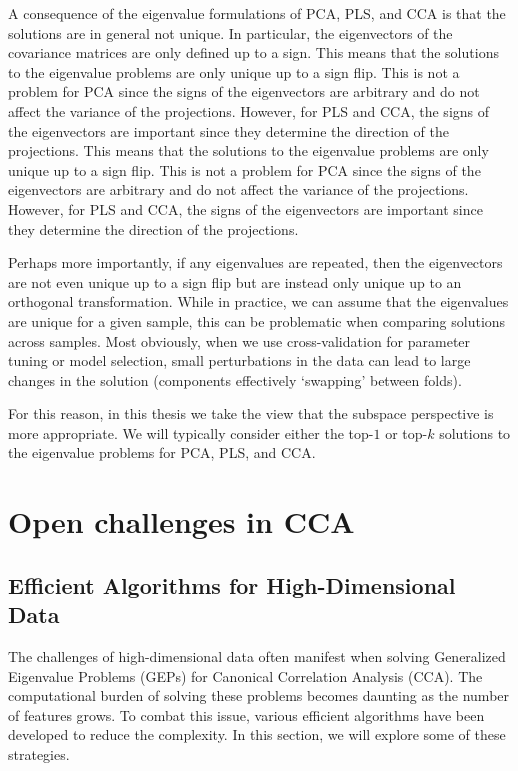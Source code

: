 A consequence of the eigenvalue formulations of PCA, PLS, and CCA is that the solutions are in general not unique.
In particular, the eigenvectors of the covariance matrices are only defined up to a sign.
This means that the solutions to the eigenvalue problems are only unique up to a sign flip.
This is not a problem for PCA since the signs of the eigenvectors are arbitrary and do not affect the variance of the projections.
However, for PLS and CCA, the signs of the eigenvectors are important since they determine the direction of the projections.
This means that the solutions to the eigenvalue problems are only unique up to a sign flip.
This is not a problem for PCA since the signs of the eigenvectors are arbitrary and do not affect the variance of the projections.
However, for PLS and CCA, the signs of the eigenvectors are important since they determine the direction of the projections.

Perhaps more importantly, if any eigenvalues are repeated, then the eigenvectors are not even unique up to a sign flip
but are instead only unique up to an orthogonal transformation.
While in practice, we can assume that the eigenvalues are unique for a given sample, this can be problematic when comparing solutions across samples.
Most obviously, when we use cross-validation for parameter tuning or model selection, small perturbations in the data
can lead to large changes in the solution (components effectively `swapping' between folds).

For this reason, in this thesis we take the view that the subspace perspective is more appropriate. We will typically
consider either the top-$1$ or top-$k$ solutions to the eigenvalue problems for PCA, PLS, and CCA.

\section{Open challenges in CCA}

\subsection{Efficient Algorithms for High-Dimensional Data}

The challenges of high-dimensional data often manifest when solving Generalized Eigenvalue Problems (GEPs) for Canonical Correlation Analysis (CCA). The computational burden of solving these problems becomes daunting as the number of features grows. To combat this issue, various efficient algorithms have been developed to reduce the complexity. In this section, we will explore some of these strategies.


